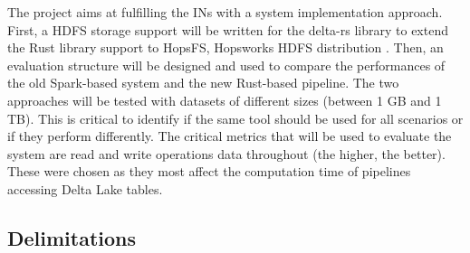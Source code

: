 The project aims at fulfilling the \glspl{IN} with a system implementation approach. First, a \gls{HDFS} storage support will be written for the delta-rs library to extend the Rust library support to HopsFS, Hopsworks \gls{HDFS} distribution \cite{niaziHopsFSScalingHierarchical2017}. Then, an evaluation structure will be designed and used to compare the performances of the old Spark-based system and the new Rust-based pipeline. The two approaches will be tested with datasets of different sizes (between 1 GB and 1 TB). This is critical to identify if the same tool should be used for all scenarios or if they perform differently. The critical metrics that will be used to evaluate the system are read and write operations data throughout (the higher, the better). These were chosen as they most affect the computation time of pipelines accessing Delta Lake tables.

\subsection{Delimitations}
    \label{subsec:delimitations}
    
